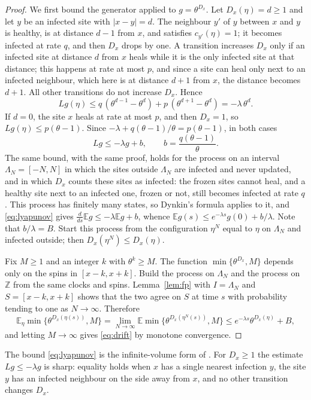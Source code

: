 \documentclass[11pt]{amsart}
\theoremstyle{remark}
\newcommand{\E}{\mathbb{E}}
\newcommand{\Z}{\mathbb{Z}}
\begin{document}
\begin{proof}
We first bound the generator applied to $g=\theta^{D_x}$. Let $D_x(\eta)=d\ge1$ and let $y$ be an infected site with
$|x-y|=d$. The neighbour $y'$ of $y$ between $x$ and $y$ is healthy, is at distance $d-1$ from $x$, and satisfies
$c_{y'}(\eta)=1$; it becomes infected at rate $q$, and then $D_x$ drops by one. A transition increases $D_x$ only if
an infected site at distance $d$ from $x$ heals while it is the only infected site at that distance; this happens
at rate at most $p$, and since a site can heal only next to an infected neighbour, which here is at distance $d+1$
from $x$, the distance becomes $d+1$. All other transitions do not increase $D_x$. Hence
\[
Lg(\eta)\le q\,(\theta^{d-1}-\theta^d)+p\,(\theta^{d+1}-\theta^d)=-\lambda\,\theta^d.
\]
If $d=0$, the site $x$ heals at rate at most $p$, and then $D_x=1$, so $Lg(\eta)\le p(\theta-1)$. Since
$-\lambda+q(\theta-1)/\theta=p(\theta-1)$, in both cases
\begin{equation}\label{eq:lyapunov}
Lg\le-\lambda g+b,\qquad b=\frac{q(\theta-1)}{\theta}.
\end{equation}
The same bound, with the same proof, holds for the process on an interval $\Lambda_N=[-N,N]$ in which the sites
outside $\Lambda_N$ are infected and never updated, and in which $D_x$ counts these sites as infected: the frozen
sites cannot heal, and a healthy site next to an infected one, frozen or not, still becomes infected at rate $q$.
This process has finitely many states, so Dynkin's formula applies to it, and \eqref{eq:lyapunov} gives
$\frac{d}{ds}\E g\le-\lambda\E g+b$, whence $\E g(s)\le e^{-\lambda s}g(0)+b/\lambda$. Note that $b/\lambda=B$.
Start this process from the configuration $\eta^N$ equal to $\eta$ on $\Lambda_N$ and infected outside; then
$D_x(\eta^N)\le D_x(\eta)$.

Fix $M\ge1$ and an integer $k$ with $\theta^k\ge M$. The function $\min\{\theta^{D_x},M\}$ depends only on the spins
in $[x-k,x+k]$. Build the process on $\Lambda_N$ and the process on $\Z$ from the same clocks and spins. Lemma~\ref{lem:fp}
with $I=\Lambda_N$ and $S=[x-k,x+k]$ shows that the two agree on $S$ at time $s$ with probability tending to one as
$N\to\infty$. Therefore
\[
\E_\eta\min\{\theta^{D_x(\eta(s))},M\}=\lim_{N\to\infty}\E\min\{\theta^{D_x(\eta^N(s))},M\}
\le e^{-\lambda s}\theta^{D_x(\eta)}+B,
\]
and letting $M\to\infty$ gives \eqref{eq:drift} by monotone convergence.
\end{proof}

The bound \eqref{eq:lyapunov} is the infinite-volume form of \cite[Proposition~4.1]{BCMRT13}. For $D_x\ge1$ the estimate
$Lg\le-\lambda g$ is sharp: equality holds when $x$ has a single nearest infection $y$, the site $y$ has an infected neighbour on the side away
from $x$, and no other transition changes $D_x$.
\end{document}
